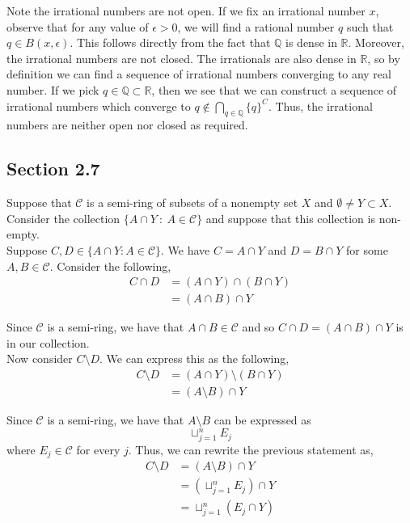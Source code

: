 \documentclass[12pt]{article}
\newenvironment{problem}[2][Problem]{\begin{trivlist}
\item[\hskip \labelsep {\bfseries #1}\hskip \labelsep {\bfseries #2.}]}{\end{trivlist}}
\begin{document}
Note the irrational numbers are not open. If we fix an irrational number $x$, observe that for any value of $\epsilon > 0$, we will find a rational number $q$ such that $q \in B(x, \epsilon)$. This follows directly from the fact that $\mathbb{Q}$ is dense in $\mathbb{R}$. Moreover, the irrational numbers are not closed. The irrationals are also dense in $\mathbb{R}$, so by definition we can find a sequence of irrational numbers converging to any real number. If we pick $q \in \mathbb{Q} \subset \mathbb{R}$, then we see that we can construct a sequence of irrational numbers which converge to $q \not\in \bigcap_{q \in \mathbb{Q}} \{q\}^C$. Thus, the irrational numbers are neither open nor closed as required.

\begin{problem}{5}
\end{problem}

\subsection{Section 2.7}

\begin{problem}{1}
\end{problem}

Suppose that $\mathcal{C}$ is a semi-ring of subsets of a nonempty set $X$ and $\emptyset \neq Y \subset X$. Consider the collection $\{A \cap Y \ : \ A \in \mathcal{C} \}$ and suppose that this collection is non-empty.\\

Suppose $C, D \in \{A \cap Y : A \in \mathcal{C} \}$. We have $C = A \cap Y$ and $D = B \cap Y$ for some $A, B \in \mathcal{C}$. Consider the following,
\begin{align*}
C \cap D &= (A \cap Y) \cap (B \cap Y)\\
&= (A \cap B) \cap Y
\end{align*}

Since $\mathcal{C}$ is a semi-ring, we have that $A \cap B \in \mathcal{C}$ and so $C \cap D = (A \cap B) \cap Y$ is in our collection.\\

Now consider $C \setminus D$. We can express this as the following,
\begin{align*}
C \setminus D &= (A \cap Y) \setminus (B \cap Y)\\
&= (A \setminus B) \cap Y
\end{align*}

Since $\mathcal{C}$ is a semi-ring, we have that $A \setminus B$ can be expressed as $$\sqcup_{j=1}^n E_j$$ where $E_j \in \mathcal{C}$ for every $j$. Thus, we can rewrite the previous statement as,
\begin{align*}
C \setminus D &= (A \setminus B) \cap Y\\
&= (\sqcup_{j=1}^n E_j) \cap Y\\
&= \sqcup_{j=1}^n (E_j \cap Y)
\end{align*}
\end{document}
